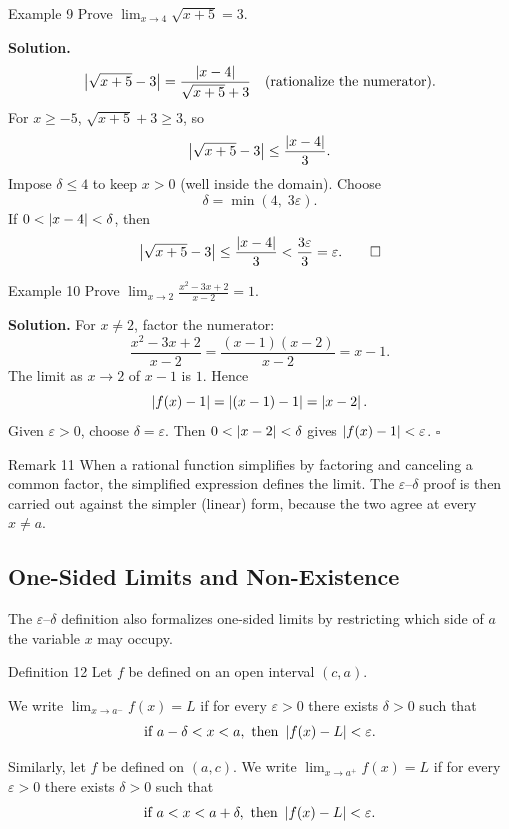 \begin{examplebox}{Example 9}
Prove \(\displaystyle\lim_{x \to 4} \sqrt{x + 5} = 3\).

\medskip
\textbf{Solution.}
\[
\left|\sqrt{x + 5} - 3\right|
= \frac{\left|x - 4\right|}{\sqrt{x + 5} + 3}
\quad\text{(rationalize the numerator)}.
\]
For \(x \ge -5\), \(\sqrt{x + 5} + 3 \ge 3\), so
\[
\left|\sqrt{x + 5} - 3\right| \le \frac{\left|x - 4\right|}{3}.
\]
Impose \(\delta \le 4\) to keep \(x > 0\) (well inside the domain). Choose
\[
\delta = \min(4,\; 3\varepsilon).
\]
If \(0 < \left|x - 4\right| < \delta\), then
\[
\left|\sqrt{x + 5} - 3\right| \le \frac{\left|x - 4\right|}{3} < \frac{3\varepsilon}{3} = \varepsilon.\qquad\square
\]
\end{examplebox}

\begin{examplebox}{Example 10}
Prove \(\displaystyle\lim_{x \to 2} \frac{x^{2} - 3x + 2}{x - 2} = 1\).

\medskip
\textbf{Solution.}
For \(x \ne 2\), factor the numerator:
\[
\frac{x^{2} - 3x + 2}{x - 2}
= \frac{(x - 1)(x - 2)}{x - 2}
= x - 1.
\]
The limit as \(x \to 2\) of \(x - 1\) is \(1\). Hence
\[
\left|f(x) - 1\right| = \left|(x - 1) - 1\right| = \left|x - 2\right|.
\]
Given \(\varepsilon > 0\), choose \(\delta = \varepsilon\). Then \(0 < \left|x - 2\right| < \delta\) gives \(\left|f(x) - 1\right| < \varepsilon\). \(\square\)
\end{examplebox}

\begin{remarkbox}{Remark 11}
When a rational function simplifies by factoring and canceling a common factor, the simplified expression defines the limit. The \(\varepsilon\)--\(\delta\) proof is then carried out against the simpler (linear) form, because the two agree at every \(x \neq a\).
\end{remarkbox}

\subsection*{One-Sided Limits and Non-Existence}
\label{subsec:1.4.4}

The \(\varepsilon\)--\(\delta\) definition also formalizes one-sided limits by restricting which side of \(a\) the variable \(x\) may occupy.

\begin{definitionbox}{Definition 12}
Let \(f\) be defined on an open interval \((c, a)\).

We write \(\lim_{x \to a^{-}} f(x) = L\) if for every \(\varepsilon > 0\) there exists \(\delta > 0\) such that
\[
\text{if } a - \delta < x < a,\text{ then } \left|f(x) - L\right| < \varepsilon.
\]

Similarly, let \(f\) be defined on \((a, c)\). We write \(\lim_{x \to a^{+}} f(x) = L\) if for every \(\varepsilon > 0\) there exists \(\delta > 0\) such that
\[
\text{if } a < x < a + \delta,\text{ then } \left|f(x) - L\right| < \varepsilon.
\]
\end{definitionbox}

